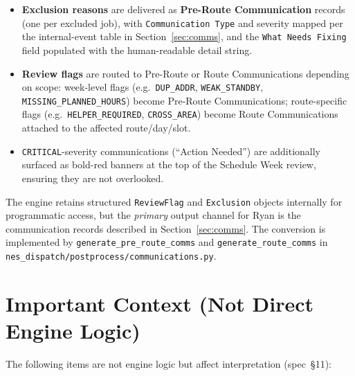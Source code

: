 \documentclass[12pt]{article}
\begin{document}
\begin{itemize}
    \item \textbf{Exclusion reasons} are delivered as \textbf{Pre-Route Communication} records (one per excluded job), with
          \texttt{Communication Type} and severity mapped per the internal-event table in Section~\ref{sec:comms},
          and the \texttt{What Needs Fixing} field populated with the human-readable detail string.
    \item \textbf{Review flags} are routed to Pre-Route or Route Communications depending on scope:
          week-level flags (e.g.\ \texttt{DUP\_ADDR}, \texttt{WEAK\_STANDBY}, \texttt{MISSING\_PLANNED\_HOURS}) become Pre-Route Communications;
          route-specific flags (e.g.\ \texttt{HELPER\_REQUIRED}, \texttt{CROSS\_AREA}) become Route Communications attached to the affected route/day/slot.
    \item \texttt{CRITICAL}-severity communications (``Action Needed'') are additionally surfaced as bold-red banners at the top of the Schedule Week review, ensuring they are not overlooked.
\end{itemize}

The engine retains structured \texttt{ReviewFlag} and \texttt{Exclusion} objects internally for programmatic access, but the \emph{primary} output channel for Ryan is the communication records described in Section~\ref{sec:comms}.
The conversion is implemented by \texttt{generate\_pre\_route\_comms} and \texttt{generate\_route\_comms} in \texttt{nes\_dispatch/postprocess/communications.py}.

\section*{Important Context (Not Direct Engine Logic)}
\label{sec:context}

The following items are not engine logic but affect interpretation (spec~\S11):
\end{document}
